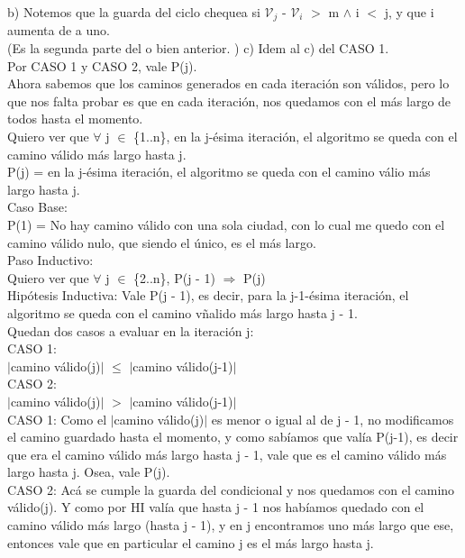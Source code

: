 \documentclass{article}
\theoremstyle{definition}
\theoremstyle{remark}
\begin{document}
b) Notemos que la guarda del ciclo chequea si $\mathcal{V}_j$ - $\mathcal{V}_i$ $>$ m $\wedge$ i $<$ j, y que i aumenta de a uno. \\
(Es la segunda parte del o bien anterior. )
c) Idem al c) del CASO 1.\\

Por CASO 1 y CASO 2, vale P(j).\\

Ahora sabemos que los caminos generados en cada iteración son válidos, pero lo que nos falta probar es que en cada iteración, nos quedamos con el más largo de todos hasta el momento. \\
Quiero ver que $\forall$ j $\in$ \{1..n\}, en la j-ésima iteración, el algoritmo se queda con el camino válido más largo hasta j. \\

P(j) = en la j-ésima iteración, el algoritmo se queda con el camino válio más largo hasta j. \\

Caso Base: \\
P(1) = No hay camino válido con una sola ciudad, con lo cual me quedo con el camino válido nulo, que siendo el único, es el más largo. \\

Paso Inductivo: \\
Quiero ver que $\forall$ j $\in$ \{2..n\}, P(j - 1) $\Rightarrow$ P(j) \\
Hipótesis Inductiva: Vale P(j - 1), es decir, para la j-1-ésima iteración, el algoritmo se queda con el camino vñalido más largo hasta j - 1. \\

Quedan dos casos a evaluar en la iteración j: \\
CASO 1: \\
$\vert$camino válido(j)$\vert$ $\leq$ $\vert$camino válido(j-1)$\vert$ \\
CASO 2: \\
$\vert$camino válido(j)$\vert$ $>$ $\vert$camino válido(j-1)$\vert$ \\

CASO 1:
Como el $\vert$camino válido(j)$\vert$ es menor o igual al de j - 1, no modificamos el camino guardado hasta el momento, y como sabíamos que valía P(j-1), es decir que era el camino válido más largo hasta j - 1, vale que es el camino válido más largo hasta j. Osea, vale P(j). \\

CASO 2:
Acá se cumple la guarda del condicional y nos quedamos con el camino válido(j). Y como por HI valía que hasta j - 1 nos habíamos quedado con el camino válido más largo (hasta j - 1), y en j encontramos uno más largo que ese, entonces vale que en particular el camino j es el más largo hasta j. \\
\end{document}
